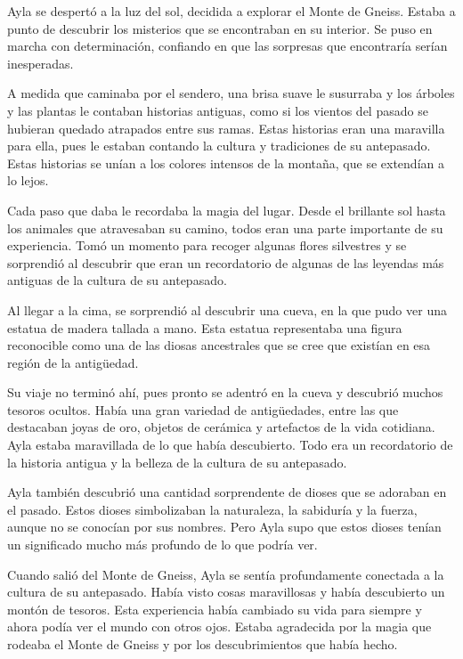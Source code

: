 

Ayla se despertó a la luz del sol, decidida a explorar el Monte de Gneiss. Estaba a punto de descubrir los misterios que se encontraban en su interior. Se puso en marcha con determinación, confiando en que las sorpresas que encontraría serían inesperadas.

A medida que caminaba por el sendero, una brisa suave le susurraba y los árboles y las plantas le contaban historias antiguas, como si los vientos del pasado se hubieran quedado atrapados entre sus ramas. Estas historias eran una maravilla para ella, pues le estaban contando la cultura y tradiciones de su antepasado. Estas historias se unían a los colores intensos de la montaña, que se extendían a lo lejos.

Cada paso que daba le recordaba la magia del lugar. Desde el brillante sol hasta los animales que atravesaban su camino, todos eran una parte importante de su experiencia. Tomó un momento para recoger algunas flores silvestres y se sorprendió al descubrir que eran un recordatorio de algunas de las leyendas más antiguas de la cultura de su antepasado.

Al llegar a la cima, se sorprendió al descubrir una cueva, en la que pudo ver una estatua de madera tallada a mano. Esta estatua representaba una figura reconocible como una de las diosas ancestrales que se cree que existían en esa región de la antigüedad.

Su viaje no terminó ahí, pues pronto se adentró en la cueva y descubrió muchos tesoros ocultos. Había una gran variedad de antigüedades, entre las que destacaban joyas de oro, objetos de cerámica y artefactos de la vida cotidiana. Ayla estaba maravillada de lo que había descubierto. Todo era un recordatorio de la historia antigua y la belleza de la cultura de su antepasado.

Ayla también descubrió una cantidad sorprendente de dioses que se adoraban en el pasado. Estos dioses simbolizaban la naturaleza, la sabiduría y la fuerza, aunque no se conocían por sus nombres. Pero Ayla supo que estos dioses tenían un significado mucho más profundo de lo que podría ver.

Cuando salió del Monte de Gneiss, Ayla se sentía profundamente conectada a la cultura de su antepasado. Había visto cosas maravillosas y había descubierto un montón de tesoros. Esta experiencia había cambiado su vida para siempre y ahora podía ver el mundo con otros ojos. Estaba agradecida por la magia que rodeaba el Monte de Gneiss y por los descubrimientos que había hecho.